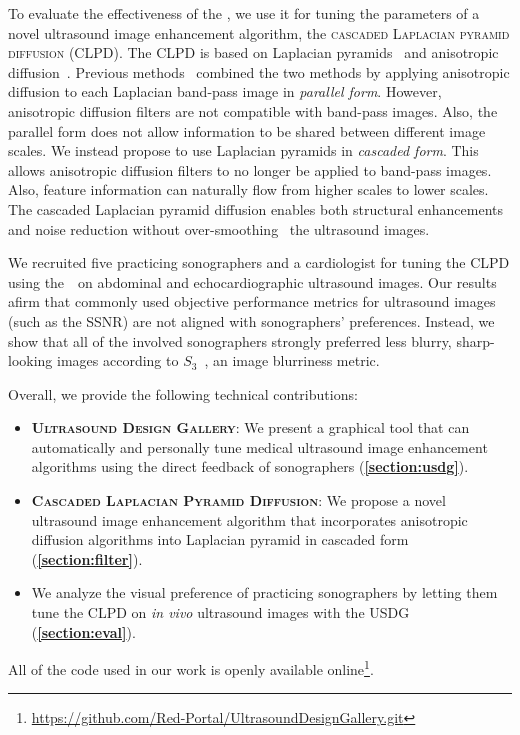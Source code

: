 To evaluate the effectiveness of the \usdg, we use it for tuning the parameters of a novel ultrasound image enhancement algorithm, the \textsc{cascaded Laplacian pyramid diffusion} (CLPD).
The CLPD is based on Laplacian pyramids~\cite{burt_laplacian_1983} and anisotropic diffusion~\cite{perona_scalespace_1990, weickert_anisotropic_1998}.
Previous methods~\cite{zhang_multiscale_2006, zhang_nonlinear_2007, kang_new_2016} combined the two methods by applying anisotropic diffusion to each Laplacian band-pass image in \textit{parallel form}.
However, anisotropic diffusion filters are not compatible with band-pass images.
Also, the parallel form does not allow information to be shared between different image scales.
We instead propose to use Laplacian pyramids in \textit{cascaded form}.
This allows anisotropic diffusion filters to no longer be applied to band-pass images.
Also, feature information can naturally flow from higher scales to lower scales.
The cascaded Laplacian pyramid diffusion enables both structural enhancements and noise reduction without over-smoothing~\cite{ramos-llorden_anisotropic_2015, mishra_edge_2018} the ultrasound images.

We recruited five practicing sonographers and a cardiologist for tuning the CLPD using the~\usdg~on abdominal and echocardiographic ultrasound images.
Our results afirm that commonly used objective performance metrics for ultrasound images (such as the SSNR) are not aligned with sonographers' preferences.
Instead, we show that all of the involved sonographers strongly preferred less blurry, sharp-looking images according to \(S_3\)~\cite{vu_bf_2012}, an image blurriness metric.

Overall, we provide the following technical contributions:
\begin{itemize}
  \item[\ding{228}] \textsc{\textbf{Ultrasound Design Gallery}}: We present a graphical tool that can automatically and personally tune medical ultrasound image enhancement algorithms using the direct feedback of sonographers (\textbf{\cref{section:usdg}}).
    \vspace{0.02in}
  \item[\ding{228}] \textsc{\textbf{Cascaded Laplacian Pyramid Diffusion}}:  We propose a novel ultrasound image enhancement algorithm that incorporates anisotropic diffusion algorithms into Laplacian pyramid in cascaded form (\textbf{\cref{section:filter}}).
  \item[\ding{228}] We analyze the visual preference of practicing sonographers by letting them tune the CLPD on \textit{in vivo} ultrasound images with the USDG (\textbf{\cref{section:eval}}).
\end{itemize}
All of the code used in our work is openly available online\footnote{\url{https://github.com/Red-Portal/UltrasoundDesignGallery.git}}.

